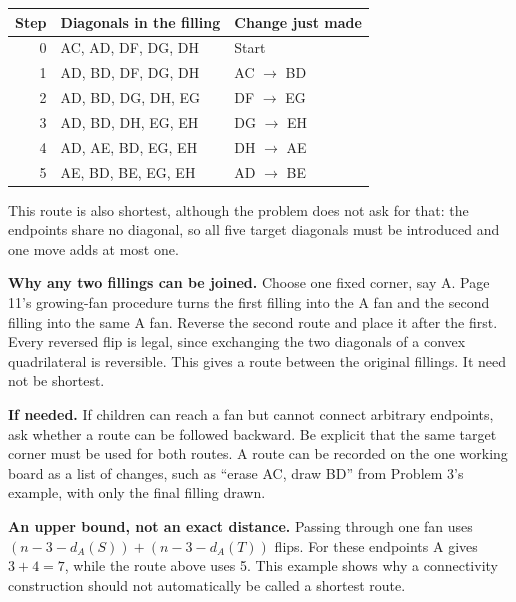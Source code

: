 \documentclass[11pt,letterpaper]{article}
\newcommand{\hint}[1]{\par\textbf{If needed.} #1\par}
\begin{document}
\begin{center}\begin{tabular}{rll}\toprule Step & Diagonals in the filling & Change just made\\\midrule
0 & AC, AD, DF, DG, DH & Start\\
1 & AD, BD, DF, DG, DH & AC $\to$ BD\\
2 & AD, BD, DG, DH, EG & DF $\to$ EG\\
3 & AD, BD, DH, EG, EH & DG $\to$ EH\\
4 & AD, AE, BD, EG, EH & DH $\to$ AE\\
5 & AE, BD, BE, EG, EH & AD $\to$ BE\\
\bottomrule\end{tabular}\end{center}

This route is also shortest, although the problem does not ask for that: the endpoints share no diagonal, so all five target diagonals must be introduced and one move adds at most one.

\textbf{Why any two fillings can be joined.} Choose one fixed corner, say A. Page 11's growing-fan procedure turns the first filling into the A fan and the second filling into the same A fan. Reverse the second route and place it after the first. Every reversed flip is legal, since exchanging the two diagonals of a convex quadrilateral is reversible. This gives a route between the original fillings. It need not be shortest.
\hint{If children can reach a fan but cannot connect arbitrary endpoints, ask whether a route can be followed backward. Be explicit that the same target corner must be used for both routes. A route can be recorded on the one working board as a list of changes, such as ``erase AC, draw BD'' from Problem 3's example, with only the final filling drawn.}
\textbf{An upper bound, not an exact distance.} Passing through one fan uses $(n-3-d_A(S))+(n-3-d_A(T))$ flips. For these endpoints A gives $3+4=7$, while the route above uses 5. This example shows why a connectivity construction should not automatically be called a shortest route.
\end{document}
